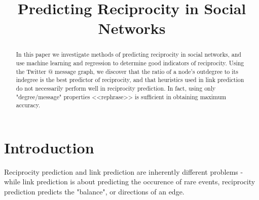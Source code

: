 \documentclass[conference]{IEEEtran}
\begin{document}
\title{Predicting Reciprocity in Social Networks}

\author{
\and
{}
\and
{}
}

\maketitle

\begin{abstract}
In this paper we investigate methods of predicting reciprocity in social networks, and use machine learning and regression to determine good indicators of reciprocity. Using the Twitter @ message graph, we discover that the ratio of a node's outdegree to its indegree is the best predictor of reciprocity, and that heuristics used in link prediction do not necessarily perform well in reciprocity prediction. In fact, using only "degree/message" properties <<rephrase>> is sufficient in obtaining maximum accuracy.
\end{abstract}


%
\IEEEpeerreviewmaketitle

\section{Introduction}
Reciprocity prediction and link prediction are inherently different problems - while link prediction is about predicting the occurence of rare events, reciprocity prediction predicts the "balance", or directions of an edge.
\end{document}
